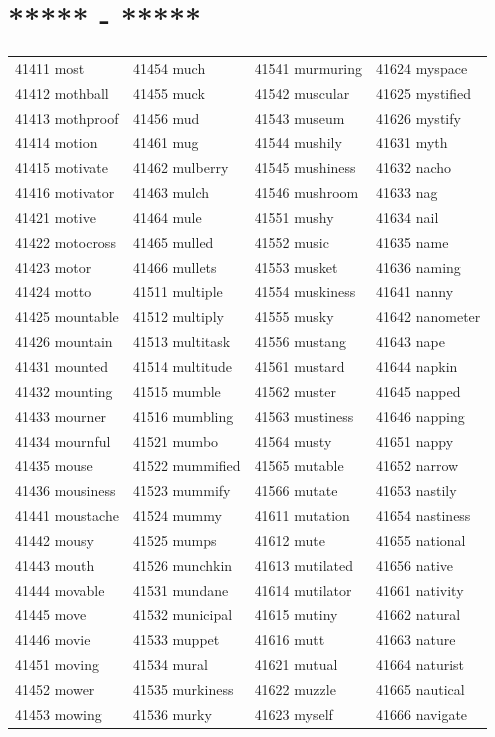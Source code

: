 \documentclass[10pt, oneside]{book}
\begin{document}
\begin{table}[h]
	\centering
	\section*{***** - *****}
	\begin{tabular}{l l l l}
41411 most &41454 much &41541 murmuring &41624 myspace\\
41412 mothball &41455 muck &41542 muscular &41625 mystified\\
41413 mothproof &41456 mud &41543 museum &41626 mystify\\
41414 motion &41461 mug &41544 mushily &41631 myth\\
41415 motivate &41462 mulberry &41545 mushiness &41632 nacho\\
41416 motivator &41463 mulch &41546 mushroom &41633 nag\\
41421 motive &41464 mule &41551 mushy &41634 nail\\
41422 motocross &41465 mulled &41552 music &41635 name\\
41423 motor &41466 mullets &41553 musket &41636 naming\\
41424 motto &41511 multiple &41554 muskiness &41641 nanny\\
41425 mountable &41512 multiply &41555 musky &41642 nanometer\\
41426 mountain &41513 multitask &41556 mustang &41643 nape\\
41431 mounted &41514 multitude &41561 mustard &41644 napkin\\
41432 mounting &41515 mumble &41562 muster &41645 napped\\
41433 mourner &41516 mumbling &41563 mustiness &41646 napping\\
41434 mournful &41521 mumbo &41564 musty &41651 nappy\\
41435 mouse &41522 mummified &41565 mutable &41652 narrow\\
41436 mousiness &41523 mummify &41566 mutate &41653 nastily\\
41441 moustache &41524 mummy &41611 mutation &41654 nastiness\\
41442 mousy &41525 mumps &41612 mute &41655 national\\
41443 mouth &41526 munchkin &41613 mutilated &41656 native\\
41444 movable &41531 mundane &41614 mutilator &41661 nativity\\
41445 move &41532 municipal &41615 mutiny &41662 natural\\
41446 movie &41533 muppet &41616 mutt &41663 nature\\
41451 moving &41534 mural &41621 mutual &41664 naturist\\
41452 mower &41535 murkiness &41622 muzzle &41665 nautical\\
41453 mowing &41536 murky &41623 myself &41666 navigate\\
	\end{tabular}
 \end{table}
\end{document}
